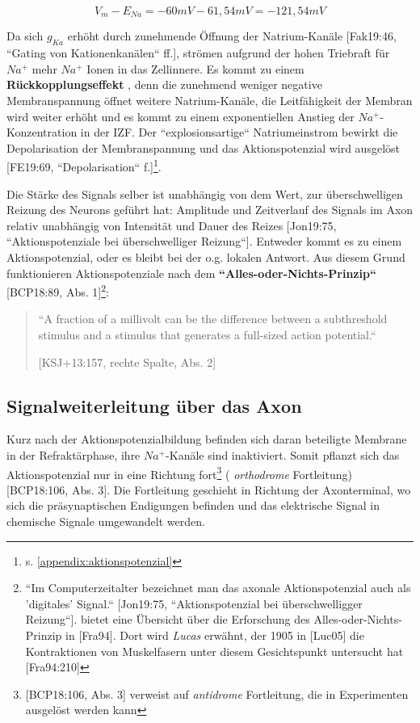 {{ \begin{equation}
  V_m - E_{Na} = -60 mV - 61,54 mV = -121,54 mV
  \label{eq:gl-triebkraft}
 \end{equation}


Da sich $g_{Ka}$ erhöht durch zunehmende Öffnung der Natrium-Kanäle  [Fak19:46, ``Gating von Kationenkanälen`` ff.], strömen aufgrund der hohen Triebraft für $Na^+$ mehr $Na^+$ Ionen in das Zellinnere. Es kommt zu einem \textbf{Rückkopplungseffekt} , denn die zunehmend weniger negative Membranspannung öffnet weitere Natrium-Kanäle, die Leitfähigkeit der Membran wird weiter erhöht und es kommt zu einem exponentiellen Anstieg der $Na^+$-Konzentration in der IZF. Der ``explosionsartige`` Natriumeinstrom bewirkt die Depolarisation der Membranspannung und das Aktionspotenzial wird ausgelöst [FE19:69, ``Depolarisation`` f.]\footnote{
s. \ref{appendix:aktionspotenzial}
}.

Die Stärke des Signals selber ist unabhängig von dem Wert, zur überschwelligen Reizung des Neurons geführt hat: Amplitude und Zeitverlauf des Signals im Axon relativ unabhängig von Intensität und Dauer des Reizes [Jon19:75, ``Aktionspotenziale bei überschwelliger Reizung``]. Entweder kommt es zu einem Aktionspotenzial, oder es bleibt bei der o.g. lokalen Antwort. Aus diesem Grund funktionieren Aktionspotenziale nach dem \textbf{``Alles-oder-Nichts-Prinzip``} [BCP18:89, Abs. 1]\footnote{
 ``Im Computerzeitalter bezeichnet man das axonale Aktionspotenzial auch als 'digitales' Signal.`` {[Jon19:75, ``Aktionspotenzial bei überschwelligger Reizung``]}.  bietet eine Übersicht über die Erforschung des Alles-oder-Nichts-Prinzip in [Fra94]. Dort wird \textit{Lucas} erwähnt, der 1905 in {[Luc05]} die Kontraktionen von Muskelfasern unter diesem Gesichtspunkt untersucht hat {[Fra94:210]}
}:

\blockquote[{[KSJ+13:157, rechte Spalte, Abs. 2]}]{
 ``A fraction of a millivolt can be the difference between a subthreshold stimulus and a stimulus that generates a full-sized action potential.``
}

\subsection{Signalweiterleitung über das Axon}

Kurz nach der Aktionspotenzialbildung befinden sich daran beteiligte Membrane in der Refraktärphase, ihre $Na^+$-Kanäle sind inaktiviert. 
Somit pflanzt sich das Aktionspotenzial nur in eine Richtung fort\footnote{
  {[BCP18:106, Abs. 3]} verweist auf \textit{antidrome} Fortleitung, die in Experimenten ausgelöst werden kann
} ( \textit{orthodrome} Fortleitung) [BCP18:106, Abs. 3].
Die Fortleitung geschieht in Richtung der Axonterminal, wo sich die präsynaptischen Endigungen befinden und das elektrische Signal in chemische Signale umgewandelt werden.

}}

